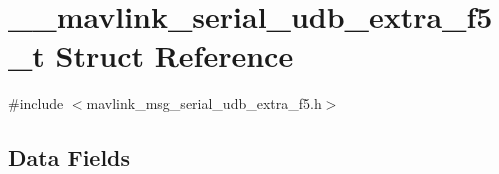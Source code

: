 \hypertarget{struct____mavlink__serial__udb__extra__f5__t}{\section{\+\_\+\+\_\+mavlink\+\_\+serial\+\_\+udb\+\_\+extra\+\_\+f5\+\_\+t Struct Reference}
\label{struct____mavlink__serial__udb__extra__f5__t}
}


{\ttfamily \#include $<$mavlink\+\_\+msg\+\_\+serial\+\_\+udb\+\_\+extra\+\_\+f5.\+h$>$}

\subsection*{Data Fields}

